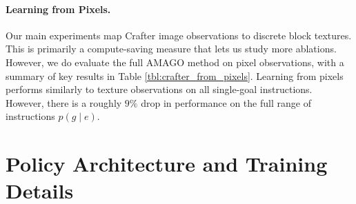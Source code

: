 \documentclass{article}
\begin{document}
\paragraph{Learning from Pixels.} Our main experiments map Crafter image observations to discrete block textures. This is primarily a compute-saving measure that lets us study more ablations. However, we do evaluate the full AMAGO method on pixel observations, with a summary of key results in Table \ref{tbl:crafter_from_pixels}. Learning from pixels performs similarly to texture observations on all single-goal instructions. However, there is a roughly $9\%$ drop in performance on the full range of instructions $p(g \mid e)$.
\section{Policy Architecture and Training Details}
\label{app:hparams}
\end{document}
